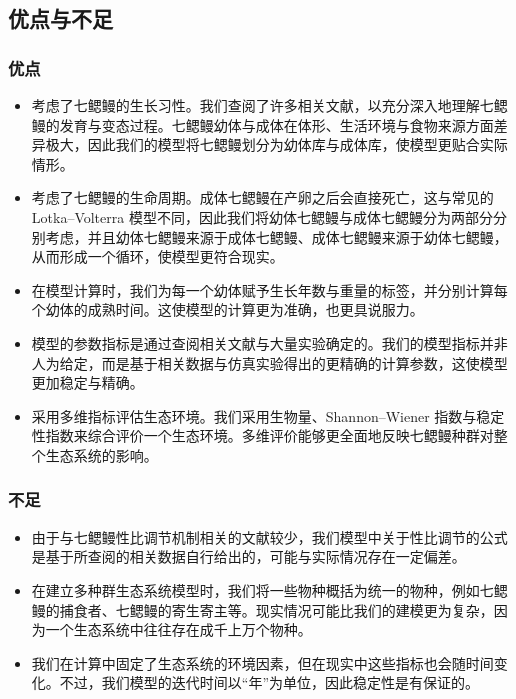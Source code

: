 \documentclass[11pt,a4paper]{ctexart}
\begin{document}
\subsection{优点与不足}

\subsubsection{优点}

\begin{itemize}
\item 考虑了七鳃鳗的生长习性。我们查阅了许多相关文献，以充分深入地理解七鳃鳗的发育与变态过程。七鳃鳗幼体与成体在体形、生活环境与食物来源方面差异极大，因此我们的模型将七鳃鳗划分为幼体库与成体库，使模型更贴合实际情形。
\item 考虑了七鳃鳗的生命周期。成体七鳃鳗在产卵之后会直接死亡，这与常见的 Lotka--Volterra 模型不同，因此我们将幼体七鳃鳗与成体七鳃鳗分为两部分分别考虑，并且幼体七鳃鳗来源于成体七鳃鳗、成体七鳃鳗来源于幼体七鳃鳗，从而形成一个循环，使模型更符合现实。
\item 在模型计算时，我们为每一个幼体赋予生长年数与重量的标签，并分别计算每个幼体的成熟时间。这使模型的计算更为准确，也更具说服力。
\item 模型的参数指标是通过查阅相关文献与大量实验确定的。我们的模型指标并非人为给定，而是基于相关数据与仿真实验得出的更精确的计算参数，这使模型更加稳定与精确。
\item 采用多维指标评估生态环境。我们采用生物量、Shannon--Wiener 指数与稳定性指数来综合评价一个生态环境。多维评价能够更全面地反映七鳃鳗种群对整个生态系统的影响。
\end{itemize}

\subsubsection{不足}

\begin{itemize}
\item 由于与七鳃鳗性比调节机制相关的文献较少，我们模型中关于性比调节的公式是基于所查阅的相关数据自行给出的，可能与实际情况存在一定偏差。
\item 在建立多种群生态系统模型时，我们将一些物种概括为统一的物种，例如七鳃鳗的捕食者、七鳃鳗的寄生寄主等。现实情况可能比我们的建模更为复杂，因为一个生态系统中往往存在成千上万个物种。
\item 我们在计算中固定了生态系统的环境因素，但在现实中这些指标也会随时间变化。不过，我们模型的迭代时间以“年”为单位，因此稳定性是有保证的。
\end{itemize}
\end{document}
